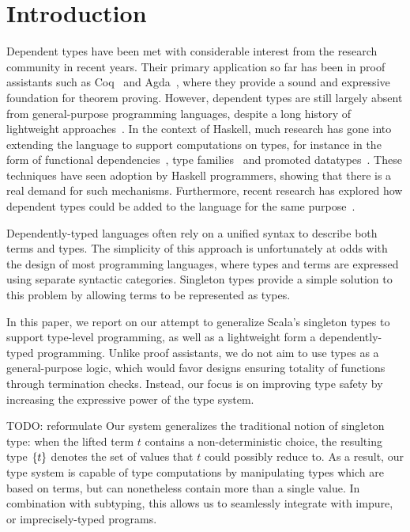 \section{Introduction}

Dependent types have been met with considerable interest from the research community in recent years.
Their primary application so far has been in proof assistants such as Coq~\citep{bertot2004interactive} and Agda~\citep{norell2007towards}, where they provide a sound and expressive foundation for theorem proving.
However, dependent types are still largely absent from general-purpose programming languages, despite a long history of lightweight approaches~\citep{xi1998eliminating}.
In the context of Haskell, much research has gone into extending the language to support computations on types, for instance in the form of functional dependencies~\citep{jones2000type}, type families~\citep{kiselyov2010fun} and promoted datatypes~\citep{yorgey2012giving}.
These techniques have seen adoption by Haskell programmers, showing that there is a real demand for such mechanisms.
Furthermore, recent research has explored how dependent types could be added to the language for the same purpose~\citep{eisenberg2016dependent, weirich2017a}.

Dependently-typed languages often rely on a unified syntax to describe both terms and types.
The simplicity of this approach is unfortunately at odds with the design of most programming languages, where types and terms are expressed using separate syntactic categories.
Singleton types provide a simple solution to this problem by allowing terms to be represented as types.

In this paper, we report on our attempt to generalize Scala's singleton types to support type-level programming, as well as a lightweight form a dependently-typed programming.
Unlike proof assistants, we do not aim to use types as a general-purpose logic, which would favor designs ensuring totality of functions through termination checks.
Instead, our focus is on improving type safety by increasing the expressive power of the type system.

TODO: reformulate
Our system generalizes the traditional notion of singleton type: when the lifted term $t$ contains a non-deterministic choice, the resulting type $\lbrace t \rbrace$ denotes the set of values that $t$ could possibly reduce to.
As a result, our type system is capable of type computations by manipulating types which are based on terms, but can nonetheless contain more than a single value.
In combination with subtyping, this allows us to seamlessly integrate with impure, or imprecisely-typed programs.

